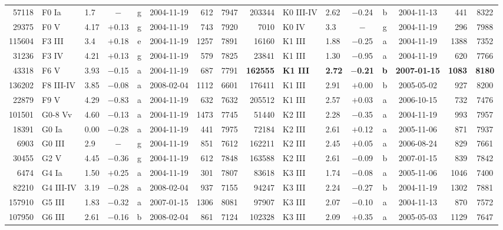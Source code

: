 \begin{table}
{\begin{tabular}{|r l l c c c r c || r l l c c c r c|}
 57118 & F0 Ia    & 1.7  & $-$     & g & 2004-11-19 &  612 & 7947 & 203344 & K0 III-IV& 2.62 & $-$0.24 & b & 2004-11-13 &  441 & 8322 \\
 29375 & F0 V     & 4.17 & $+$0.13 & g & 2004-11-19 &  743 & 7920 &   7010 & K0 IV    & 3.3  & $-$     & g & 2004-11-19 &  296 & 7988 \\
115604 & F3 III   & 3.4  & $+$0.18 & e & 2004-11-19 & 1257 & 7891 &  16160 & K1 III   & 1.88 & $-$0.25 & a & 2004-11-19 & 1388 & 7352 \\
 31236 & F3 IV    & 4.21 & $+$0.13 & g & 2004-11-19 &  579 & 7825 &  23841 & K1 III   & 1.30 & $-$0.95 & a & 2004-11-19 &  620 & 7766 \\
 43318 & F6 V     & 3.93 & $-$0.15 & a & 2004-11-19 &  687 & 7791 &\bf{162555}&\bf{K1 III}&\bf{2.72}&\bf{$-$0.21}&{\bf b}&\bf{2007-01-15}&\bf{1083}& \bf{8180} \\
136202 & F8 III-IV& 3.85 & $-$0.08 & a & 2008-02-04 & 1112 & 6601 & 176411 & K1 III   & 2.91 & $+$0.00 & b & 2005-05-02 &  927 & 8200 \\
 22879 & F9 V     & 4.29 & $-$0.83 & a & 2004-11-19 &  632 & 7632 & 205512 & K1 III   & 2.57 & $+$0.03 & a & 2006-10-15 &  732 & 7476 \\
101501 & G0-8 Vv  & 4.60 & $-$0.13 & a & 2004-11-19 & 1473 & 7745 &  51440 & K2 III   & 2.28 & $-$0.35 & a & 2004-11-19 &  993 & 7957 \\
 18391 & G0 Ia    & 0.00 & $-$0.28 & a & 2004-11-19 &  441 & 7975 &  72184 & K2 III   & 2.61 & $+$0.12 & a & 2005-11-06 &  871 & 7937 \\
  6903 & G0 III   & 2.9  & $-$     & g & 2004-11-19 &  851 & 7612 & 162211 & K2 III   & 2.45 & $+$0.05 & a & 2006-08-24 &  829 & 7661 \\
 30455 & G2 V     & 4.45 & $-$0.36 & g & 2004-11-19 &  612 & 7848 & 163588 & K2 III   & 2.61 & $-$0.09 & b & 2007-01-15 &  839 & 7842 \\
  6474 & G4 Ia    & 1.50 & $+$0.25 & a & 2004-11-19 &  301 & 7807 &  83618 & K3 III   & 1.74 & $-$0.08 & a & 2005-11-06 & 1046 & 7400 \\
 82210 & G4 III-IV& 3.19 & $-$0.28 & a & 2008-02-04 &  937 & 7155 &  94247 & K3 III   & 2.24 & $-$0.27 & b & 2004-11-19 & 1302 & 7881 \\
157910 & G5 III   & 1.83 & $-$0.32 & a & 2007-01-15 & 1306 & 8081 &  97907 & K3 III   & 2.07 & $-$0.10 & a & 2004-11-13 &  870 & 7572 \\
107950 & G6 III   & 2.61 & $-$0.16 & b & 2008-02-04 &  861 & 7124 & 102328 & K3 III   & 2.09 & $+$0.35 & a & 2005-05-03 & 1129 & 7647 \\

\end{tabular}}
\end{table}

